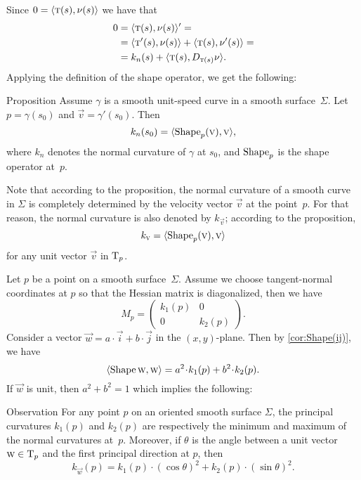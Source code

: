 Since $0=\langle \text{\sc{t}}(s),\nu(s)\rangle$ we have 
that 
\begin{align*}
0&=\langle \text{\sc{t}}(s),\nu(s)\rangle'=
\\
&=\langle \text{\sc{t}}'(s),\nu(s)\rangle+\langle \text{\sc{t}}(s),\nu'(s)\rangle=
\\
&=k_n(s)+\langle \text{\sc{t}}(s),D_{\text{\sc{t}}(s)}\nu\rangle.
\end{align*}
Applying the definition of the shape operator,
we get the following:

\begin{thm}{Proposition}\label{prop:normal-shape}
Assume $\gamma$ is a smooth unit-speed curve in a smooth surface~$\Sigma$.
Let $p=\gamma(s_0)$ and $\vec v=\gamma'(s_0)$.
Then 
\[k_n(s_0)=\langle \mathop{\rm Shape}\nolimits_p(\text{\sc{v}}),\text{\sc{v}}\rangle,\]
where $k_n$ denotes the normal curvature of $\gamma$ at $s_0$, and $\mathop{\rm Shape}\nolimits_p$ is the shape operator at~$p$.
\end{thm}

Note that according to the proposition, the normal curvature of a smooth curve in $\Sigma$ is completely determined by the velocity vector $\vec v$ at the point~$p$.
For that reason, the normal curvature is also denoted by $k_{\vec v}$;
according to the proposition,
\[k_{\text{\sc{v}}}=\langle \mathop{\rm Shape}\nolimits_p(\text{\sc{v}}),\text{\sc{v}}\rangle\]
for any unit vector $\vec v$ in $\mathrm{T}_p$.

Let $p$ be a point on a smooth surface~$\Sigma$.
Assume we choose tangent-normal coordinates at $p$ so that the Hessian matrix is diagonalized, then we have
\[M_p=\begin{pmatrix}
 k_1(p)
 &0
 \\
 0
 &k_2(p)
 \end{pmatrix}.
\]
Consider a vector ${\vec w}=a\cdot\vec i+b\cdot\vec j$ in the $(x,y)$-plane.
Then by \ref{cor:Shape(ij)}, we have
\[
\langle \Shape\vec w,\vec w\rangle
=a^2\cdot k_1(p) +b^2\cdot k_2(p). 
\]
If ${\vec w}$ is unit, then $a^2+b^2=1$ which implies the following:

\begin{thm}{Observation}\label{obs:k1-k2}
For any point $p$ on an oriented smooth surface $\Sigma$,
the principal curvatures $k_1(p)$ and $k_2(p)$ are respectively the minimum and maximum of the normal curvatures at~$p$.
Moreover, if $\theta$ is the angle between a unit vector ${\text{\sc{w}}}\in\mathrm{T}_p$ and the first principal direction at $p$, then 
\[k_{\vec w}(p)=k_1(p)\cdot(\cos\theta)^2+k_2(p)\cdot(\sin\theta)^2.\]

\end{thm}

